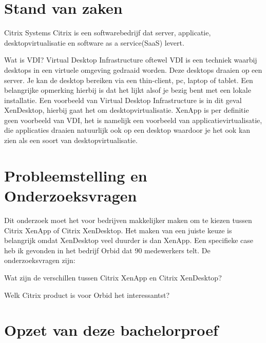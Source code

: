 \section{Stand van zaken}
\label{sec:stand-van-zaken}


Citrix Systems
Citrix is een softwarebedrijf dat server, applicatie, desktopvirtualisatie en software as a service(SaaS) levert.

Wat is VDI?
Virtual Desktop Infrastructure oftewel VDI is een techniek waarbij desktops in een virtuele omgeving gedraaid worden. Deze desktops draaien op een server. Je kan de desktop bereiken via een thin-client, pc, laptop of tablet. Een belangrijke opmerking hierbij is dat het lijkt alsof je bezig bent met een lokale installatie. Een voorbeeld van Virtual Desktop Infrastructure is in dit geval XenDesktop, hierbij gaat het om desktopvirtualisatie. XenApp is per definitie geen voorbeeld van VDI, het is namelijk een voorbeeld van applicatievirtualisatie, die applicaties draaien natuurlijk ook op een desktop waardoor je het ook kan zien als een soort van desktopvirtualisatie.

\section{Probleemstelling en Onderzoeksvragen}
\label{sec:onderzoeksvragen}

Dit onderzoek moet het voor bedrijven makkelijker maken om te kiezen tussen Citrix XenApp of Citrix XenDesktop. Het maken van een juiste keuze is belangrijk omdat XenDesktop veel duurder is dan XenApp. Een specifieke case heb ik gevonden in het bedrijf Orbid dat 90 medewerkers telt. De onderzoeksvragen zijn:


\item Wat zijn de verschillen tussen Citrix XenApp en Citrix
XenDesktop?
\item Welk Citrix product is voor Orbid het interessantst?

\section{Opzet van deze bachelorproef}
\label{sec:opzet-bachelorproef}


